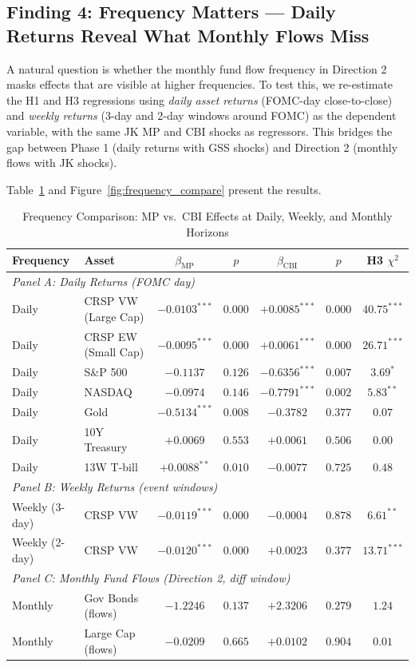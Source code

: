 \documentclass[11pt,a4paper]{article}
\begin{document}
\subsection{Finding 4: Frequency Matters — Daily Returns Reveal What Monthly Flows Miss}
\label{sec:finding4}

A natural question is whether the monthly fund flow frequency in Direction 2 masks effects that are visible at higher frequencies. To test this, we re-estimate the H1 and H3 regressions using \textit{daily asset returns} (FOMC-day close-to-close) and \textit{weekly returns} (3-day and 2-day windows around FOMC) as the dependent variable, with the same JK MP and CBI shocks as regressors. This bridges the gap between Phase 1 (daily returns with GSS shocks) and Direction 2 (monthly flows with JK shocks).

Table~\ref{tab:frequency_compare} and Figure~\ref{fig:frequency_compare} present the results.

\begin{table}[H]
\centering
\caption{Frequency Comparison: MP vs.\ CBI Effects at Daily, Weekly, and Monthly Horizons}
\label{tab:frequency_compare}
\begin{tabular}{llccccc}
\toprule
Frequency & Asset & $\beta_{\text{MP}}$ & $p$ & $\beta_{\text{CBI}}$ & $p$ & H3 $\chi^2$ \\
\midrule
\multicolumn{7}{l}{\textit{Panel A: Daily Returns (FOMC day)}} \\
\midrule
Daily & CRSP VW (Large Cap) & $-0.0103^{***}$ & $0.000$ & $+0.0085^{***}$ & $0.000$ & $40.75^{***}$ \\
Daily & CRSP EW (Small Cap) & $-0.0095^{***}$ & $0.000$ & $+0.0061^{***}$ & $0.000$ & $26.71^{***}$ \\
Daily & S\&P 500 & $-0.1137$ & $0.126$ & $-0.6356^{***}$ & $0.007$ & $3.69^{*}$ \\
Daily & NASDAQ & $-0.0974$ & $0.146$ & $-0.7791^{***}$ & $0.002$ & $5.83^{**}$ \\
Daily & Gold & $-0.5134^{***}$ & $0.008$ & $-0.3782$ & $0.377$ & $0.07$ \\
Daily & 10Y Treasury & $+0.0069$ & $0.553$ & $+0.0061$ & $0.506$ & $0.00$ \\
Daily & 13W T-bill & $+0.0088^{**}$ & $0.010$ & $-0.0077$ & $0.725$ & $0.48$ \\
\midrule
\multicolumn{7}{l}{\textit{Panel B: Weekly Returns (event windows)}} \\
\midrule
Weekly (3-day) & CRSP VW & $-0.0119^{***}$ & $0.000$ & $-0.0004$ & $0.878$ & $6.61^{**}$ \\
Weekly (2-day) & CRSP VW & $-0.0120^{***}$ & $0.000$ & $+0.0023$ & $0.377$ & $13.71^{***}$ \\
\midrule
\multicolumn{7}{l}{\textit{Panel C: Monthly Fund Flows (Direction 2, diff window)}} \\
\midrule
Monthly & Gov Bonds (flows) & $-1.2246$ & $0.137$ & $+2.3206$ & $0.279$ & $1.24$ \\
Monthly & Large Cap (flows) & $-0.0209$ & $0.665$ & $+0.0102$ & $0.904$ & $0.01$ \\
\bottomrule
\end{tabular}
\end{table}
\end{document}

